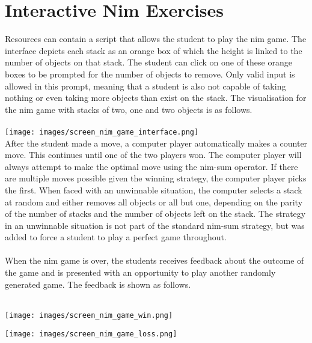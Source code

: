 \section{Interactive Nim Exercises}
\label{sec:apx_nimjs}
Resources can contain a script that allows the student to play the nim
game. The interface depicts each stack as an orange box of which the height is linked to the number of objects on that stack. The student can click on one of these
orange boxes to be prompted for the number of objects to remove. Only valid
input is allowed in this prompt, meaning that a student is also not capable of
taking nothing or even taking more objects than exist on the stack. The
visualisation for the nim game with stacks of two, one and two objects is as
follows.\\\\
\texttt{[image: images/screen\_nim\_game\_interface.png]}\\
After the student made a move, a computer player automatically makes a counter move.
This continues until one of the two players won. The computer player will
always attempt to make the optimal move using the nim-sum operator. If there
are multiple moves possible given the winning strategy, the computer player
picks the first. When faced with an unwinnable situation, the computer selects
a stack at random and either removes all objects or all but one, depending on
the parity of the number of stacks and the number of objects left on the stack.
The strategy in an unwinnable situation is not part of the standard nim-sum
strategy, but was added to force a student to play a perfect game
throughout.\\\\
\noindent
When the nim game is over, the students receives feedback about the outcome of
the game and is presented with an opportunity to play another randomly
generated game. The feedback is shown as follows.\\\\
\begin{minipage}{0.5\linewidth}
\texttt{[image: images/screen\_nim\_game\_win.png]}
\end{minipage}
\begin{minipage}{0.5\linewidth}
\texttt{[image: images/screen\_nim\_game\_loss.png]}
\end{minipage}

